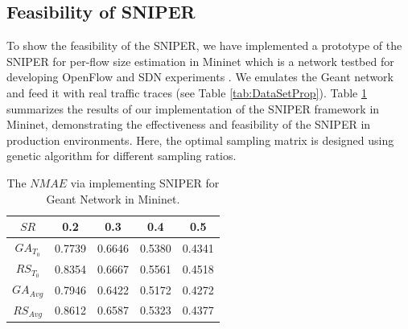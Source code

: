 \subsection{Feasibility of SNIPER} 
To show the feasibility of the SNIPER, we have implemented a prototype of the SNIPER for per-flow size estimation in Mininet which is a network testbed for developing OpenFlow and SDN experiments \cite{MininetOrg}. We emulates the Geant network and feed it with real traffic traces (see Table \ref{tab:DataSetProp}). Table \ref{tab:SNIPERGeantMininetRes} summarizes the results of our implementation of the SNIPER framework in Mininet, demonstrating the effectiveness and feasibility of the SNIPER in production environments. Here, the optimal sampling matrix is designed using genetic algorithm for different sampling ratios.
\begin{table}
	\centering
 \small{
		\begin{tabular}{| c | c | c | c | c |}
		\hline
       $SR$           & 0.2    &  0.3    &  0.4    &  0.5  \\ \hline
      $GA_{T_{0}}$    & 0.7739 &	0.6646 &	0.5380 &	0.4341     \\ \hline
      $RS_{T_{0}}$    & 0.8354 &	0.6667 &	0.5561 &	0.4518     \\ \hline
      $GA_{{Avg}}$    & 0.7946 &	0.6422 & 	0.5172 &	0.4272     \\ \hline
      $RS_{{Avg}}$    & 0.8612 &	0.6587 &	0.5323 &	0.4377     \\ \hline
    \end{tabular}
	\caption{{The $NMAE$ via implementing SNIPER for Geant Network in Mininet.}}
	\label{tab:SNIPERGeantMininetRes}
}
\end{table}

